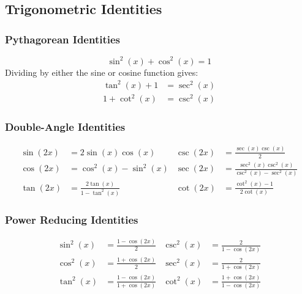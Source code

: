 \documentclass{article}
\begin{document}
\subsection{Trigonometric Identities}
\subsubsection{Pythagorean Identities}
\begin{equation*}
	\sin^2{\left( x \right)} + \cos^2{\left( x \right)} = 1
\end{equation*}
Dividing by either the sine or cosine function gives:
\begin{align*}
	\tan^2{\left( x \right)} + 1 &= \sec^2{\left( x \right)} \\
	1 + \cot^2{\left( x \right)} &= \csc^2{\left( x \right)}
\end{align*}
\subsubsection{Double-Angle Identities}
\begin{align*}
    \sin{\left( 2x \right)} &= 2\sin{\left( x \right)}\cos{\left( x \right)}              & \csc{\left( 2x \right)} &= \frac{\sec{\left( x \right)}\csc{\left( x \right)}}{2} \\[5pt]
    \cos{\left( 2x \right)} &= \cos^2{\left( x \right)} - \sin^2{\left( x \right)}        & \sec{\left( 2x \right)} &= \frac{\sec^2{\left( x \right)}\csc^2{\left( x \right)}}{\csc^2{\left( x \right)}-\sec^2{\left( x \right)}} \\[5pt]
	\tan{\left( 2x \right)} &= \frac{2\tan{\left( x \right)}}{1-\tan^2{\left( x \right)}} & \cot{\left( 2x \right)} &= \frac{\cot^2{\left( x \right)}-1}{2\cot{\left( x \right)}}
\end{align*}
\subsubsection{Power Reducing Identities}
\begin{align*}
    \sin^2{\left( x \right)} &= \frac{1-\cos{\left( 2x \right)}}{2}                         & \csc^2{\left( x \right)} &= \frac{2}{1-\cos{\left( 2x \right)}} \\[5pt]
    \cos^2{\left( x \right)} &= \frac{1+\cos{\left( 2x \right)}}{2}                         & \sec^2{\left( x \right)} &= \frac{2}{1+\cos{\left( 2x \right)}} \\[5pt]
	\tan^2{\left( x \right)} &= \frac{1-\cos{\left( 2x \right)}}{1+\cos{\left( 2x \right)}} & \cot^2{\left( x \right)} &= \frac{1+\cos{\left( 2x \right)}}{1-\cos{\left( 2x \right)}}
\end{align*}
\end{document}

